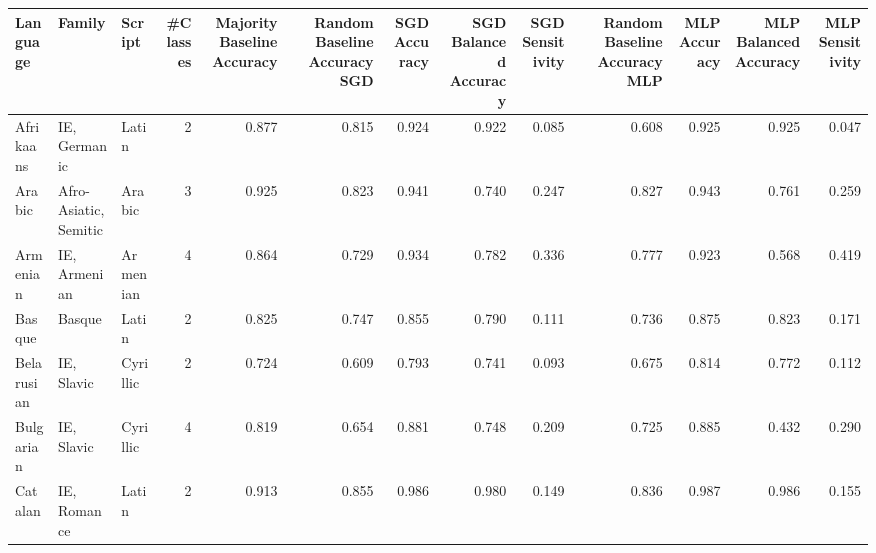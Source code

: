 \begin{tabular}{lllrrrrrrrrrr}
\toprule
                       Language &                          Family &     Script &  #Classes &  Majority Baseline Accuracy &  Random Baseline Accuracy SGD &  SGD Accuracy &  SGD Balanced Accuracy &  SGD Sensitivity &  Random Baseline Accuracy MLP &  MLP Accuracy &  MLP Balanced Accuracy &  MLP Sensitivity \\
\midrule
                      Afrikaans &                    IE, Germanic &      Latin &         2 &                       0.877 &                         0.815 &         0.924 &                  0.922 &            0.085 &                         0.608 &         0.925 &                  0.925 &            0.047 \\
                         Arabic &           Afro-Asiatic, Semitic &     Arabic &         3 &                       0.925 &                         0.823 &         0.941 &                  0.740 &            0.247 &                         0.827 &         0.943 &                  0.761 &            0.259 \\
                       Armenian &                    IE, Armenian &   Armenian &         4 &                       0.864 &                         0.729 &         0.934 &                  0.782 &            0.336 &                         0.777 &         0.923 &                  0.568 &            0.419 \\
                         Basque &                          Basque &      Latin &         2 &                       0.825 &                         0.747 &         0.855 &                  0.790 &            0.111 &                         0.736 &         0.875 &                  0.823 &            0.171 \\
                     Belarusian &                      IE, Slavic &   Cyrillic &         2 &                       0.724 &                         0.609 &         0.793 &                  0.741 &            0.093 &                         0.675 &         0.814 &                  0.772 &            0.112 \\
                      Bulgarian &                      IE, Slavic &   Cyrillic &         4 &                       0.819 &                         0.654 &         0.881 &                  0.748 &            0.209 &                         0.725 &         0.885 &                  0.432 &            0.290 \\
                        Catalan &                     IE, Romance &      Latin &         2 &                       0.913 &                         0.855 &         0.986 &                  0.980 &            0.149 &                         0.836 &         0.987 &                  0.986 &            0.155 \\

\end{tabular}
